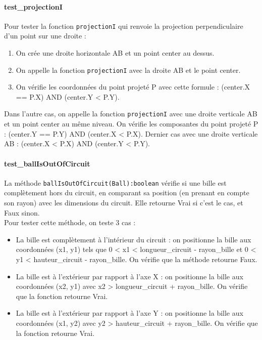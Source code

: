 \documentclass{report}
\begin{document}
\paragraph{test\_projectionI}

Pour tester la fonction \texttt{projectionI} qui renvoie la projection perpendiculaire d’un point sur une droite :

\begin{enumerate}
\item On crée une droite horizontale AB et un point center au dessus.
\item On appelle la fonction \texttt{projectionI} avec la droite AB et le point center.
\item On vérifie les coordonnées du point projeté P avec cette formule : (center.X == P.X) AND (center.Y < P.Y).
\end{enumerate}

Dans l’autre cas, on appelle la fonction \texttt{projectionI} avec une droite verticale AB et un point center au même niveau. On vérifie les composantes du point projeté P : (center.Y == P.Y) AND (center.X < P.X).
Dernier cas avec une droite verticale AB : (center.X < P.X) AND (center.Y < P.Y). 

\paragraph{test\_ballIsOutOfCircuit}

La méthode \texttt{ballIsOutOfCircuit(Ball):boolean} vérifie si une bille est complètement hors du circuit, en comparant sa position (en prenant en compte son rayon) avec les dimensions du circuit. Elle retourne Vrai si c’est le cas, et Faux sinon. \\

Pour tester cette méthode, on teste 3 cas :

\begin{itemize}
\item La bille est complètement à l’intérieur du circuit : on positionne la bille aux coordonnées (x1, y1) tels que 0 < x1 < longueur\_circuit - rayon\_bille et 0 < y1 < hauteur\_circuit - rayon\_bille. On vérifie que la méthode retourne Faux.
\item La bille est à l’extérieur par rapport à l’axe X : on positionne la bille aux coordonnées (x2, y1) avec x2 > longueur\_circuit + rayon\_bille. On vérifie que la fonction retourne Vrai.
\item La bille est à l’extérieur par rapport à l’axe Y : on positionne la bille aux coordonnées (x1, y2) avec y2 > hauteur\_circuit + rayon\_bille. On vérifie que la fonction retourne Vrai.
\end{itemize}
\end{document}
